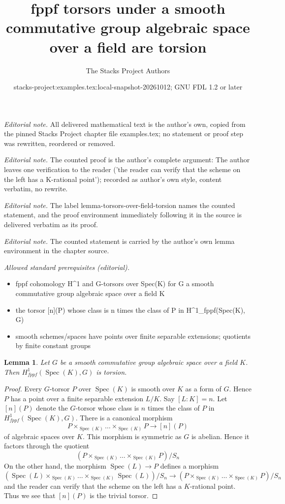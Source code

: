 \documentclass[10pt,a4paper]{amsart}
\title{fppf torsors under a smooth commutative group algebraic space over a field are torsion}
\author{The Stacks Project Authors}
\date{stacks-project:examples.tex:local-snapshot-20261012; GNU FDL 1.2 or later}
\theoremstyle{plain}
\newtheorem{lemma}[subsection]{Lemma}
\theoremstyle{definition}
\theoremstyle{remark}
\numberwithin{equation}{subsection}
\def\Spec{\mathop{\mathrm{Spec}}}
\begin{document}
\maketitle
\noindent\textit{Editorial note.} All delivered mathematical text is the author's own, copied from the pinned Stacks Project chapter file examples.tex; no statement or proof step was rewritten, reordered or removed.\par\medskip
\noindent\textit{Editorial note.} The counted proof is the author's complete argument: The author leaves one verification to the reader ('the reader can verify that the scheme on the left has a K-rational point'); recorded as author's own style, content verbatim, no rewrite.\par\medskip
\noindent\textit{Editorial note.} The label lemma-torsors-over-field-torsion names the counted statement, and the proof environment immediately following it in the source is delivered verbatim as its proof.\par\medskip
\noindent\textit{Editorial note.} The counted statement is carried by the author's own lemma environment in the chapter source.\par\medskip
\noindent\textit{Allowed standard prerequisites (editorial).}\begin{itemize}
\item fppf cohomology H\textasciicircum{}1 and G-torsors over Spec(K) for G a smooth commutative group algebraic space over a field K
\item the torsor [n](P) whose class is n times the class of P in H\textasciicircum{}1\_fppf(Spec(K), G)
\item smooth schemes/spaces have points over finite separable extensions; quotients by finite constant groups
\end{itemize}\medskip
\begin{lemma}
\label{lemma-torsors-over-field-torsion}
Let $G$ be a smooth commutative group algebraic space over a field $K$.
Then $H^1_{fppf}(\Spec(K), G)$ is torsion.
\end{lemma}

\begin{proof}
Every $G$-torsor $P$ over $\Spec(K)$ is smooth over $K$ as a form of $G$.
Hence $P$ has a point over a finite separable extension $L/K$.
Say $[L : K] = n$. Let $[n](P)$ denote the $G$-torsor whose class is $n$
times the class of $P$ in $H^1_{fppf}(\Spec(K), G)$. There is a canonical
morphism
$$
P \times_{\Spec(K)} \ldots \times_{\Spec(K)} P \to [n](P)
$$
of algebraic spaces over $K$. This morphism is symmetric as
$G$ is abelian. Hence it factors through the quotient
$$
(P \times_{\Spec(K)} \ldots \times_{\Spec(K)} P)/S_n
$$
On the other hand, the morphism $\Spec(L) \to P$ defines a morphism
$$
(\Spec(L) \times_{\Spec(K)} \ldots \times_{\Spec(K)} \Spec(L))/S_n
\longrightarrow (P \times_{\Spec(K)} \ldots \times_{\Spec(K)} P)/S_n
$$
and the reader can verify that the scheme on the left has a $K$-rational
point. Thus we see that $[n](P)$ is the trivial torsor.
\end{proof}
\end{document}
